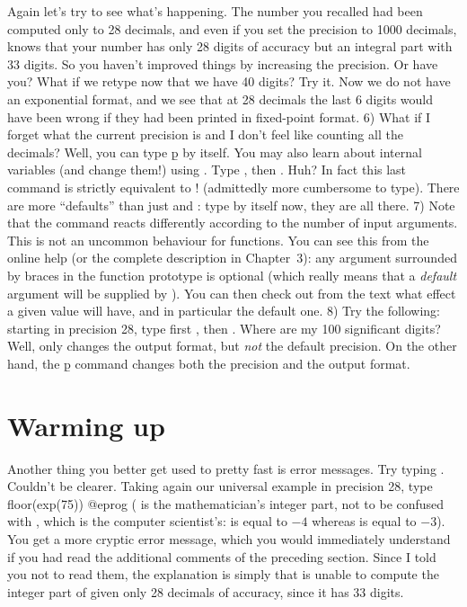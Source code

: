 Again let's try to see what's happening. The number you recalled had been
computed only to 28 decimals, and even if you set the precision to 1000
decimals,  knows that your number has only 28 digits of accuracy but
an integral part with 33 digits. So you haven't improved things by increasing
the precision. Or have you? What if we retype  now that we
have 40 digits? Try it. Now we do not have an exponential format, and we see
that at 28 decimals the last 6 digits would have been wrong if they had been
printed in fixed-point format.
\medskip
%
6) What if I forget what the current precision is and I don't feel like
counting all the decimals? Well, you can type \b{p} by itself. You may also
learn about  internal variables (and change them!) using
. Type , then
. Huh? In fact this last command is strictly
equivalent to ! (admittedly more cumbersome to type). There are
more ``defaults'' than just  and : type
 by itself now, they are all there. \smallskip
%
7) Note that the  command reacts differently according to the
number of input arguments. This is not an uncommon behaviour for 
functions. You can see this from the online help (or the complete description
in Chapter~3): any argument surrounded by braces \kbd{\obr\cbr} in the
function prototype is optional (which really means that a \emph{default}
argument will be supplied by ). You can then check out from the text
what effect a given value will have, and in particular the default one.
\smallskip
%
8) Try the following: starting in precision 28, type first
, then . Where are my 100
significant digits? Well,  only changes the output
format, but \emph{not} the default precision. On the other hand, the \b{p}
command changes both the precision and the output format.

\section{Warming up}

Another thing you better get used to pretty fast is error messages. Try
typing . Couldn't be clearer. Taking again our universal example in
precision 28, type
\bprog
  floor(exp(75))
@eprog\noindent
( is the mathematician's integer part, not to be confused with
, which is the computer scientist's:  is equal
to $-4$ whereas  is equal to $-3$).  You get a more
cryptic error message, which you would immediately understand if you had read
the additional comments of the preceding section. Since I told you not to
read them, the explanation is simply that  is unable to compute the
integer part of  given only 28 decimals of accuracy, since
it has 33 digits.

